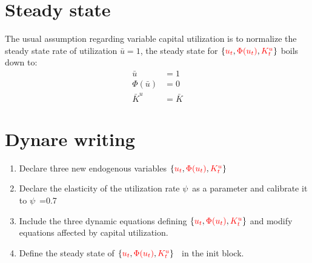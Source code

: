 \documentclass{article}%
\begin{document}
\section{Steady state}

The usual assumption regarding variable capital utilization is to normalize
the steady state rate of utilization $\bar{u}=1$, the steady state for
$\{\textcolor{red}{u_{t}},\textcolor{red}{\Phi(u_{t})},\textcolor{red}{K_{t}^{u}}\}$
boils down to:%
\begin{align*}
\bar{u}  &  =1\\
\Phi(\bar{u})  &  =0\\
\bar{K}^{u}  &  =\bar{K}%
\end{align*}


\section{Dynare writing}

\begin{enumerate}
\item Declare three new endogenous variables
$\{\textcolor{red}{u_{t}},\textcolor{red}{\Phi(u_{t})},\textcolor{red}{K_{t}^{u}}\}$%


\item Declare the elasticity of the utilization rate $\psi$\ as a parameter
and calibrate it to $\psi$\ =0.7

\item Include the three dynamic equations defining
$\{\textcolor{red}{u_{t}},\textcolor{red}{\Phi(u_{t})},\textcolor{red}{K_{t}^{u}}\}$
and modify equations affected by capital utilization.

\item Define the steady state of
$\{\textcolor{red}{u_{t}},\textcolor{red}{\Phi(u_{t})},\textcolor{red}{K_{t}^{u}}\}$%
\ in the init block.
\end{enumerate}
\end{document}
